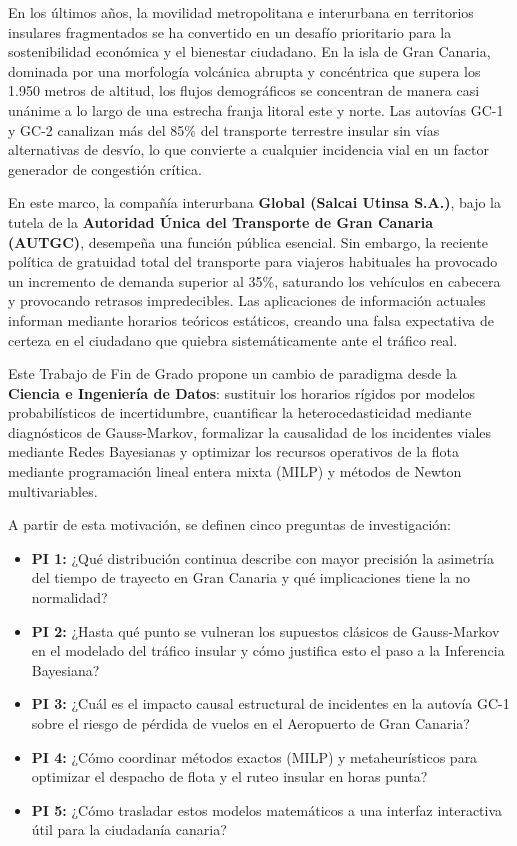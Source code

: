 \documentclass[11pt,a4paper,twoside]{report}
\begin{document}
En los últimos años, la movilidad metropolitana e interurbana en territorios insulares fragmentados se ha convertido en un desafío prioritario para la sostenibilidad económica y el bienestar ciudadano. En la isla de Gran Canaria, dominada por una morfología volcánica abrupta y concéntrica que supera los 1.950 metros de altitud, los flujos demográficos se concentran de manera casi unánime a lo largo de una estrecha franja litoral este y norte. Las autovías GC-1 y GC-2 canalizan más del 85\% del transporte terrestre insular sin vías alternativas de desvío, lo que convierte a cualquier incidencia vial en un factor generador de congestión crítica.

En este marco, la compañía interurbana \textbf{Global (Salcai Utinsa S.A.)}, bajo la tutela de la \textbf{Autoridad Única del Transporte de Gran Canaria (AUTGC)}, desempeña una función pública esencial. Sin embargo, la reciente política de gratuidad total del transporte para viajeros habituales ha provocado un incremento de demanda superior al 35\%, saturando los vehículos en cabecera y provocando retrasos impredecibles. Las aplicaciones de información actuales informan mediante horarios teóricos estáticos, creando una falsa expectativa de certeza en el ciudadano que quiebra sistemáticamente ante el tráfico real.

Este Trabajo de Fin de Grado propone un cambio de paradigma desde la \textbf{Ciencia e Ingeniería de Datos}: sustituir los horarios rígidos por modelos probabilísticos de incertidumbre, cuantificar la heterocedasticidad mediante diagnósticos de Gauss-Markov, formalizar la causalidad de los incidentes viales mediante Redes Bayesianas y optimizar los recursos operativos de la flota mediante programación lineal entera mixta (MILP) y métodos de Newton multivariables.

A partir de esta motivación, se definen cinco preguntas de investigación:
\begin{itemize}
    \item \textbf{PI 1:} ¿Qué distribución continua describe con mayor precisión la asimetría del tiempo de trayecto en Gran Canaria y qué implicaciones tiene la no normalidad?
    \item \textbf{PI 2:} ¿Hasta qué punto se vulneran los supuestos clásicos de Gauss-Markov en el modelado del tráfico insular y cómo justifica esto el paso a la Inferencia Bayesiana?
    \item \textbf{PI 3:} ¿Cuál es el impacto causal estructural de incidentes en la autovía GC-1 sobre el riesgo de pérdida de vuelos en el Aeropuerto de Gran Canaria?
    \item \textbf{PI 4:} ¿Cómo coordinar métodos exactos (MILP) y metaheurísticos para optimizar el despacho de flota y el ruteo insular en horas punta?
    \item \textbf{PI 5:} ¿Cómo trasladar estos modelos matemáticos a una interfaz interactiva útil para la ciudadanía canaria?
\end{itemize}
\end{document}
